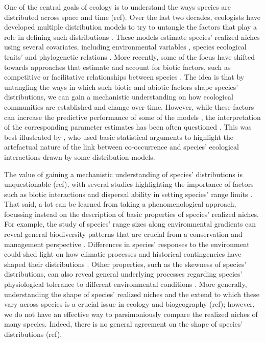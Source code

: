 \documentclass[11pt, a4paper]{article}
\begin{document}
One of the central goals of ecology is to understand the ways species are distributed across space and time (ref). Over the last two decades, ecologists have developed multiple distribution models to try to untangle the factors that play a role in defining such distributions \citep{guisanPredictiveHabitatDistribution2000}. These models estimate species' realized niches using several covariates, including environmental variables \citep{Guisan}, species ecological traits' \citep{pollockRoleFunctionalTraits2012} and phylogenetic relations \citep{ivesGeneralizedLinearMixed2011}. More recently, some of the focus have shifted towards approaches that estimate and account for biotic factors, such as competitive or facilitative relationships between species \citep{ovaskainenHowMakeMore2017}. The idea is that by untangling the ways in which such biotic and abiotic factors shape species' distributions, we can gain a mechanistic understanding on how ecological communities are established and change over time. However, while these factors can increase the predictive performance of some of the models \citep{norbergComprehensiveEvaluationPredictive2019}, the interpretation of the corresponding parameter estimates has been often questioned \citep{gotelliEmpiricalBayesApproach2010, harrisInferringSpeciesInteractions2016, thurmanTestingLinkSpecies2019}. This was best illustrated by \citet{blanchetCooccurrenceNotEvidence2020}, who used basic statistical arguments to highlight the artefactual nature of the link between co-occurrence and species' ecological interactions drawn by some distribution models.

The value of gaining a mechanistic understanding of species' distributions is unquestionable (ref), with several studies highlighting the importance of factors such as biotic interactions and dispersal ability in setting species' range limits \citep{wiszRoleBioticInteractions2013, pollockUnderstandingCooccurrenceModelling2014, neuschulzBioticInteractionsSeed2018}. That said, a lot can be learned from taking a phenomenological approach, focussing instead on the description of basic properties of species' realized niches. For example, the study of species' range sizes along environmental gradients can reveal general biodiversity patterns that are crucial from a conservation and management perspective \citep{stevensElevationalGradientAltitudinal1992}. Differences in species' responses to the environment could shed light on how climatic processes and historical contingencies have shaped their distributions \citep{rohdeLatitudinalGradientsSpecies1992, more in Rapoport}. Other properties, such as the skewness of species' distributions, can also reveal general underlying processes regarding species' physiological tolerance to different environmental conditions \citep{kaufmanDiversityNewWorld1995}. More generally, understanding the shape of species' realized niches and the extend to which these vary across species is a crucial issue in ecology and biogeography (ref); however, we do not have an effective way to parsimoniously compare the realized niches of many species. Indeed, there is no general agreement on the shape of species' distributions (ref).
\end{document}
